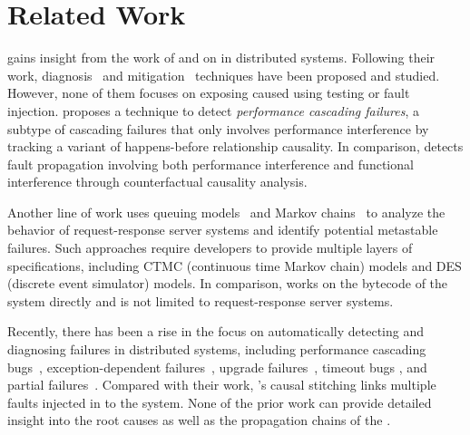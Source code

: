 \section{Related Work}

\tool gains insight from the 
work of \citet{qian2023vicious} and \citet{huang2022metastable} on \vcs in distributed systems. Following their work, diagnosis~\cite{harsh2023murphy,li2024exchain, sruthi2024demystifying}
and mitigation~\cite{li2023towards, meza2023defcon} techniques 
have been proposed and studied. 
However, none of them focuses on 
exposing 
\vcs caused 
using testing or fault injection. 
\citet{li2018pcatch} 
proposes a technique to detect 
\textit{performance cascading failures}, 
a subtype of cascading failures that 
only involves performance interference 
by tracking a variant of happens-before relationship causality. 
In comparison, 
\tool detects fault propagation involving both performance interference and functional interference 
through counterfactual causality analysis. 

Another line of work uses queuing models~\cite{habibi2023msf} and Markov chains~\cite{isaacs2025analyzing, isaacs2025formal} to analyze the behavior of request-response server systems and identify potential metastable failures. Such approaches require developers to provide multiple layers of specifications, including CTMC (continuous time Markov chain) models and DES (discrete event simulator) models. 
In comparison, \tool works on the bytecode of the system directly and is not limited to request-response server systems.


 Recently, there has been a rise in the focus on automatically detecting and diagnosing failures in distributed systems, including performance cascading bugs~\cite{li2018pcatch}, exception-dependent failures~\cite{li2024exchain}, upgrade failures~\cite{zhang2021understanding}, timeout bugs \cite{chen2024chronos}, and partial failures~\cite{wu2024efficient}. Compared with their work, \tool's causal stitching links multiple faults injected in to the system. None of the prior work can provide detailed insight into the root causes as well as the propagation chains of the \vcs.

